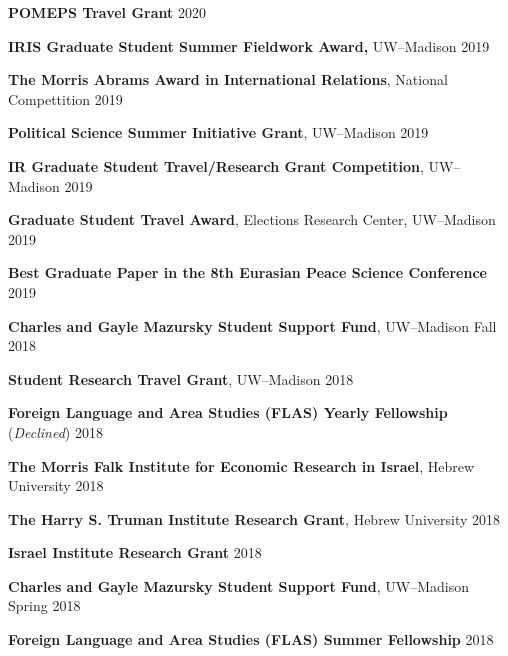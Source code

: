 \documentclass[11pt]{article}
\begin{document}
\textbf{POMEPS Travel Grant} \hfill 2020\vspace{.01in}

\textbf{IRIS Graduate Student Summer Fieldwork Award,} UW--Madison \hfill 2019\vspace{.01in}

\textbf{The Morris Abrams Award in International Relations}, National Compettition \hfill 2019\vspace{.01in}

\textbf{Political Science Summer Initiative Grant}, UW--Madison \hfill 2019\vspace{.01in}

\textbf{IR Graduate Student Travel/Research Grant Competition}, UW--Madison \hfill 2019\vspace{.01in}

\textbf{Graduate Student Travel Award}, Elections Research Center, UW--Madison \hfill  2019\vspace{.01in}

\textbf{Best Graduate Paper in the 8th Eurasian Peace Science Conference} \hfill  2019\vspace{.01in}

\textbf{Charles and Gayle Mazursky Student Support Fund}, UW--Madison \hfill  Fall 2018\vspace{.01in}

\textbf{Student Research Travel Grant}, UW--Madison \hfill 2018\vspace{.01in}

\textbf{Foreign Language and Area Studies (FLAS) Yearly Fellowship} (\emph{Declined}) \hfill 2018\vspace{.01in}

\textbf{The Morris Falk Institute for Economic Research in Israel}, Hebrew University \hfill  2018\vspace{.01in}

\textbf{The Harry S. Truman Institute Research Grant}, Hebrew University \hfill  2018\vspace{.01in}

\textbf{Israel Institute Research Grant} \hfill  2018\vspace{.01in}

\textbf{Charles and Gayle Mazursky Student Support Fund}, UW--Madison \hfill  Spring 2018\vspace{.01in}

\textbf{Foreign Language and Area Studies (FLAS) Summer Fellowship} \hfill 2018\vspace{.01in}
\end{document}
